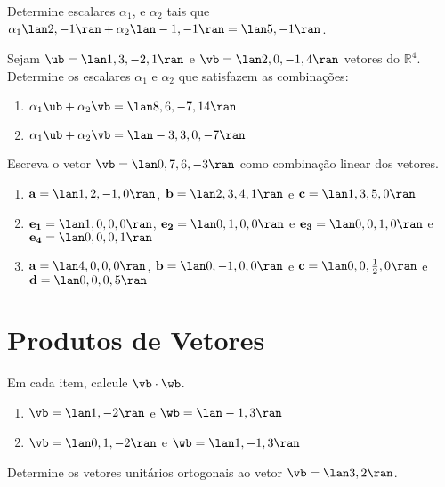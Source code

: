 \item Determine escalares $\alpha_1$, e $\alpha_2$ tais que $\alpha_1\lan 2,-1\ran + \alpha_2\lan -1, -1\ran =\lan 5, -1\ran$.%

\item Sejam $\ub =\lan 1,3,-2,1\ran$ e $\vb =\lan 2,0,-1,4\ran$ vetores do $\mathbb{R}^4$. Determine os escalares $\alpha_1$ e $\alpha_2$ que satisfazem as combinações:
    \begin{enumerate}[leftmargin=*]
        \item $\alpha_1\ub + \alpha_2\vb=\lan 8,6,-7,14\ran$
        \item $\alpha_1\ub + \alpha_2\vb=\lan -3,3,0,-7\ran$
    \end{enumerate}
\item Escreva o vetor $\vb=\lan 0,7,6,-3\ran$ como combinação linear dos vetores.
\begin{enumerate}[leftmargin=*]
    \item $\mathbf{a}=\lan 1,2,-1,0\ran$, $\mathbf{b}=\lan 2,3,4,1\ran$ e $\mathbf{c}=\lan 1,3,5,0\ran$

    \item  $\mathbf{e_1}=\lan 1,0,0,0\ran$, $\mathbf{e_2}=\lan 0,1,0,0\ran$ e $\mathbf{e_3}=\lan 0,0,1,0\ran$ e $\mathbf{e_4}=\lan 0,0,0,1\ran$

    \item $\mathbf{a}=\lan 4,0,0,0\ran$, $\mathbf{b}=\lan 0,-1,0,0\ran$ e $\mathbf{c}=\lan 0,0,\frac{1}{2},0\ran$ e $\mathbf{d}=\lan 0,0,0,5\ran$ 
\end{enumerate}

\section{Produtos de Vetores}
\item Em cada item, calcule $\vb\cdot \wb$.
    \begin{enumerate}[leftmargin=*]
        \item $\vb=\lan 1,-2\ran$ e $\wb=\lan -1, 3\ran$
        \item $\vb=\lan 0,1,-2\ran$ e $\wb=\lan 1,-1, 3\ran$
    \end{enumerate}
    
\item Determine os vetores unitários ortogonais ao vetor $\vb=\lan 3,2\ran$.

